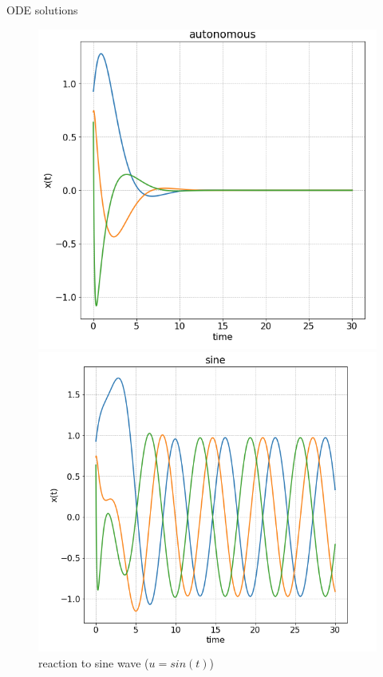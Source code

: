 \documentclass{beamer}
\begin{document}
\begin{frame}{ODE solutions}
\begin{flushleft}
\begin{figure}
  \includegraphics[width=\linewidth]{Autonomous.png}
\caption{Autonomous ODE ($u = 0$)}
\endminipage\hfill
{}
  \includegraphics[width=\linewidth]{sine.png}
\caption{reaction to sine wave ($u = sin(t)$)}
\endminipage\hfill
{}%

\end{figure}
\end{flushleft}
\end{frame}
\end{document}
